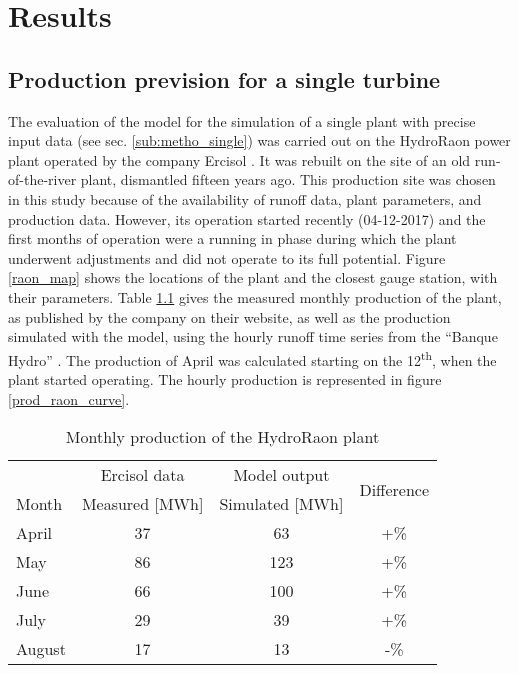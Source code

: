 \chapter{Results}
\label{chap:results}
\section{Production prevision for a single turbine}
\label{sec:res_single}

The evaluation of the model for the simulation of a single plant with precise input data (see sec. \ref{sub:metho_single}) was carried out on the HydroRaon power plant operated by the company Ercisol \cite{ercisol}. It was rebuilt on the site of an old run-of-the-river plant, dismantled fifteen years ago. This production site was chosen in this study because of the availability of runoff data, plant parameters, and production data. However, its operation started recently (04-12-2017) and the first months of operation were a running in phase during which the plant underwent adjustments and did not operate to its full potential. \newline
Figure \ref{raon_map} shows the locations of the plant and the closest gauge station, with their parameters. Table \ref{prod_raon} gives the measured monthly production of the plant, as published by the company on their website, as well as the production simulated with the model, using the hourly runoff time series from the ``Banque Hydro'' \cite{eaufrance}. The production of April was calculated starting on the 12\textsuperscript{th}, when the plant started operating. The hourly production is represented in figure \ref{prod_raon_curve}.

\begin{table}[H]
\footnotesize
 \centering
 \caption{Monthly production of the HydroRaon plant}
 \label{prod_raon}
 \begin{tabular}{l|c|c|c|}
  &Ercisol data \cite{ercisol}&Model output&\multirow{2}{*}{Difference}\\
  Month&Measured [MWh]&Simulated [MWh]&\\
  \hline
  April&37&63&+\unit[70]{\%}\\
  May&86&123&+\unit[43]{\%}\\
  June&66&100&+\unit[51]{\%}\\
  July&29&39&+\unit[34]{\%}\\
  August&17&13&-\unit[23]{\%}\\
 \end{tabular}
\end{table}

